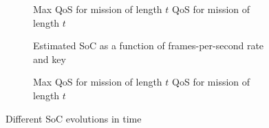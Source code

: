   \begin{figure}[p]
    \centering
    \selectfont
    \footnotesize    
    \begin{subfigure}[c]{0.32\textwidth}
      \centering
      
      \vspace*{-1.25ex}
      \caption{Max QoS for mission of length {\footnotesize $t$} QoS for mission of length {\footnotesize $t$}}
      \label{fig:max-qos}
    \end{subfigure}
    \begin{subfigure}[c]{0.32\textwidth}
      \centering
      
      \caption{Estimated SoC as a function of frames-per-second rate and key%
      }
      \label{fig:pednet}
    \end{subfigure}
    \begin{subfigure}[c]{0.32\textwidth}
      \centering
      
      \caption{Max QoS for mission of length {\footnotesize $t$} QoS for mission of length {\footnotesize $t$}}
      \label{fig:mobilenet}
    \end{subfigure}
    \caption{Different SoC evolutions in time}
    \label{fig:computational}
  \end{figure}
  
